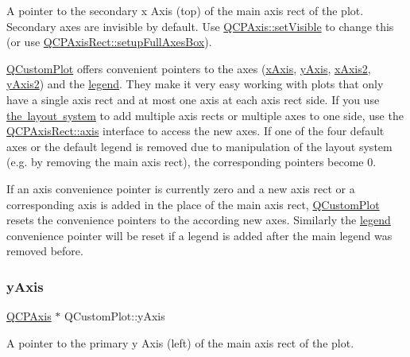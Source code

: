 A pointer to the secondary x Axis (top) of the main axis rect of the plot. Secondary axes are invisible by default. Use \mbox{\hyperlink{class_q_c_p_layerable_a3bed99ddc396b48ce3ebfdc0418744f8}{Q\+C\+P\+Axis\+::set\+Visible}} to change this (or use \mbox{\hyperlink{class_q_c_p_axis_rect_a5fa906175447b14206954f77fc7f1ef4}{Q\+C\+P\+Axis\+Rect\+::setup\+Full\+Axes\+Box}}).

\mbox{\hyperlink{class_q_custom_plot}{Q\+Custom\+Plot}} offers convenient pointers to the axes (\mbox{\hyperlink{class_q_custom_plot_a9a79cd0158a4c7f30cbc702f0fd800e4}{x\+Axis}}, \mbox{\hyperlink{class_q_custom_plot_af6fea5679725b152c14facd920b19367}{y\+Axis}}, \mbox{\hyperlink{class_q_custom_plot_ada41599f22cad901c030f3dcbdd82fd9}{x\+Axis2}}, \mbox{\hyperlink{class_q_custom_plot_af13fdc5bce7d0fabd640f13ba805c0b7}{y\+Axis2}}) and the \mbox{\hyperlink{class_q_custom_plot_a4eadcd237dc6a09938b68b16877fa6af}{legend}}. They make it very easy working with plots that only have a single axis rect and at most one axis at each axis rect side. If you use \mbox{\hyperlink{}{the layout system}} to add multiple axis rects or multiple axes to one side, use the \mbox{\hyperlink{class_q_c_p_axis_rect_a583ae4f6d78b601b732183f6cabecbe1}{Q\+C\+P\+Axis\+Rect\+::axis}} interface to access the new axes. If one of the four default axes or the default legend is removed due to manipulation of the layout system (e.\+g. by removing the main axis rect), the corresponding pointers become 0.

If an axis convenience pointer is currently zero and a new axis rect or a corresponding axis is added in the place of the main axis rect, \mbox{\hyperlink{class_q_custom_plot}{Q\+Custom\+Plot}} resets the convenience pointers to the according new axes. Similarly the \mbox{\hyperlink{class_q_custom_plot_a4eadcd237dc6a09938b68b16877fa6af}{legend}} convenience pointer will be reset if a legend is added after the main legend was removed before. \mbox{\label{class_q_custom_plot_af6fea5679725b152c14facd920b19367}} 
\subsubsection{\texorpdfstring{y\+Axis}{yAxis}}
{\footnotesize\ttfamily \mbox{\hyperlink{class_q_c_p_axis}{Q\+C\+P\+Axis}} $\ast$ Q\+Custom\+Plot\+::y\+Axis}

A pointer to the primary y Axis (left) of the main axis rect of the plot.


